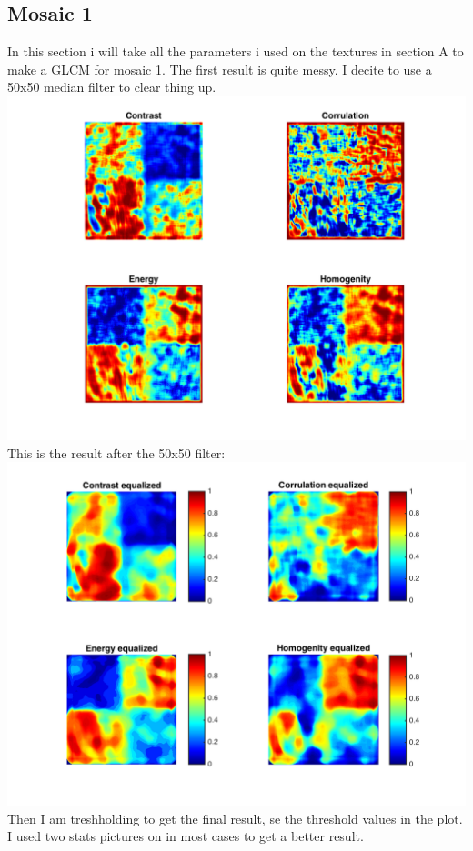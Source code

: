\documentclass{article}
\begin{document}
\subsection{Mosaic 1}
In this section i will take all the parameters i used on the textures in section A to make a GLCM for mosaic 1. The first result is quite messy. I decite to use a 50x50 median filter to clear thing up. 
\\
\includegraphics[totalheight=8cm]{img1plot.png}\\
This is the result after the 50x50 filter:
\\
\includegraphics[totalheight=8cm]{img1eplot.png}
\\
Then I am treshholding to get the final result, se the threshold values in the plot. I used two  stats pictures on in most cases to get a better result.\\
\end{document}
